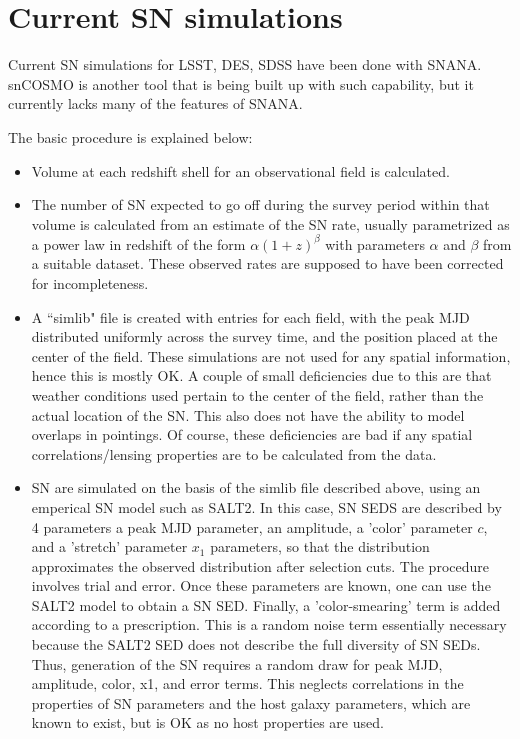 \documentclass{article}[12pt]
\begin{document}
\section{Current SN simulations}
Current SN simulations for LSST, DES, SDSS have been done with SNANA. snCOSMO
is another tool that is being built up with such capability, but it currently 
lacks many of the features of SNANA. 

The basic procedure is explained below:
\begin{itemize}
\item Volume at each redshift shell for an observational field is calculated.
\item The number of SN expected to go off during the survey period within that
volume is calculated from an estimate of the SN rate, usually parametrized 
as a power law in redshift of the form 
$\alpha (1 + z )^\beta $ with parameters $\alpha$ and $\beta$ from a suitable 
dataset. These observed rates are supposed to have been corrected for 
incompleteness. 
\item A ``simlib" file is created with entries for each field, with the peak MJD 
distributed uniformly across the survey time, and the position placed at the center of the field. These simulations are not used for any spatial information, 
hence this is mostly OK. A couple of small deficiencies due to this are that 
weather conditions used pertain to the center of the field, rather than the 
actual location of the SN. This also does not have the ability to model overlaps
 in pointings. Of course, these deficiencies are bad if any spatial correlations/lensing properties are to be calculated from the data.
\item SN are simulated on the basis of the simlib file described above, using 
an emperical SN model such as SALT2. In this case, SN SEDS are described 
by 4 parameters a peak MJD parameter, an amplitude, a 'color' parameter $c$, 
and a 'stretch' parameter $x_1$
parameters, so that the distribution approximates the observed distribution 
after selection cuts. The procedure involves trial and error. Once these 
parameters are known, one can use the SALT2 model to obtain a SN SED. 
Finally, a 'color-smearing' term is added according to a prescription. This is a
 random noise term essentially necessary because the SALT2 SED does not describe  the full diversity of SN SEDs. Thus, generation of the SN requires 
a random draw for peak MJD, amplitude, color, x1, and error terms. This neglects
correlations in the properties of SN parameters and the host galaxy parameters,
which are known to exist, but is OK as no host properties are used.
\end{itemize}
\end{document}
